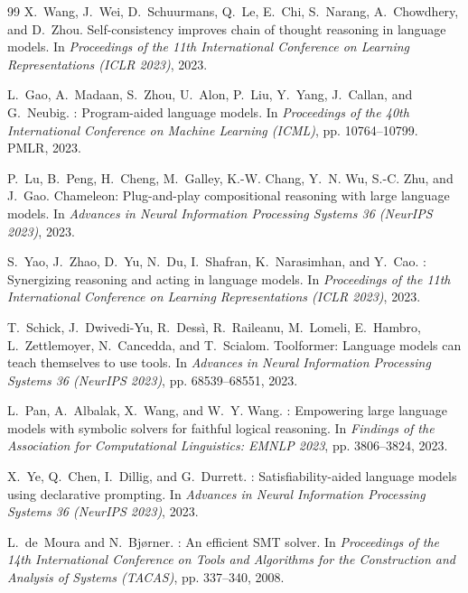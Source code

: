 \documentclass[sigconf, nonacm, onecolumn]{acmart}
\begin{document}
\begin{thebibliography}{99}
X.~Wang, J.~Wei, D.~Schuurmans, Q.~Le, E.~Chi, S.~Narang, A.~Chowdhery,
  and D.~Zhou.
\newblock Self-consistency improves chain of thought reasoning in language
  models.
\newblock In \emph{Proceedings of the 11th International Conference on
  Learning Representations (ICLR 2023)}, 2023.

L.~Gao, A.~Madaan, S.~Zhou, U.~Alon, P.~Liu, Y.~Yang, J.~Callan, and
  G.~Neubig.
: Program-aided language models.
\newblock In \emph{Proceedings of the 40th International Conference on
  Machine Learning (ICML)}, pp. 10764--10799. PMLR, 2023.

P.~Lu, B.~Peng, H.~Cheng, M.~Galley, K.-W. Chang, Y.~N. Wu, S.-C. Zhu,
  and J.~Gao.
\newblock Chameleon: Plug-and-play compositional reasoning with large
  language models.
\newblock In \emph{Advances in Neural Information Processing Systems 36
  (NeurIPS 2023)}, 2023.

S.~Yao, J.~Zhao, D.~Yu, N.~Du, I.~Shafran, K.~Narasimhan, and Y.~Cao.
: Synergizing reasoning and acting in language models.
\newblock In \emph{Proceedings of the 11th International Conference on
  Learning Representations (ICLR 2023)}, 2023.

T.~Schick, J.~Dwivedi-Yu, R.~Dess\`{i}, R.~Raileanu, M.~Lomeli,
  E.~Hambro, L.~Zettlemoyer, N.~Cancedda, and T.~Scialom.
\newblock Toolformer: Language models can teach themselves to use tools.
\newblock In \emph{Advances in Neural Information Processing Systems 36
  (NeurIPS 2023)}, pp. 68539--68551, 2023.

L.~Pan, A.~Albalak, X.~Wang, and W.~Y. Wang.
: Empowering large language models with symbolic
  solvers for faithful logical reasoning.
\newblock In \emph{Findings of the Association for Computational
  Linguistics: EMNLP 2023}, pp. 3806--3824, 2023.

X.~Ye, Q.~Chen, I.~Dillig, and G.~Durrett.
: Satisfiability-aided language models using declarative
  prompting.
\newblock In \emph{Advances in Neural Information Processing Systems 36
  (NeurIPS 2023)}, 2023.

L.~de~Moura and N.~Bj{\o}rner.
: An efficient {SMT} solver.
\newblock In \emph{Proceedings of the 14th International Conference on
  Tools and Algorithms for the Construction and Analysis of Systems
  (TACAS)}, pp. 337--340, 2008.


\end{thebibliography}
\end{document}
